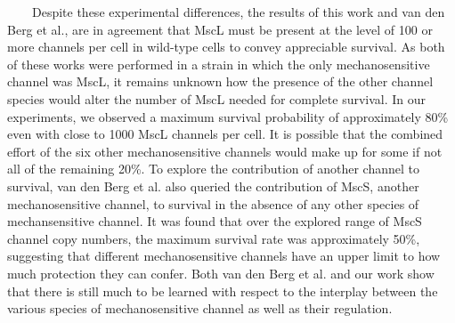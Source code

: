 ~~~~Despite
these
experimental
differences,
the
results
of
this
work
and
van
den
Berg
et
al.,
are in
agreement
that
MscL
must
be
present
at the
level
of 100
or
more
channels
per
cell
in
wild-type
cells
to
convey
appreciable
survival.
As
both
of
these
works
were
performed
in a
strain
in
which
the
only
mechanosensitive
channel
was
MscL,
it
remains
unknown
how
the
presence
of the
other
channel
species
would
alter
the
number
of
MscL
needed
for
complete
survival.
In our
experiments,
we
observed
a
maximum
survival
probability
of
approximately
80\%
even
with
close
to
1000
MscL
channels
per
cell.
It is
possible
that
the
combined
effort
of the
six
other
mechanosensitive
channels
would
make
up for
some
if not
all of
the
remaining
20\%.
To
explore
the
contribution
of
another
channel
to
survival,
van
den
Berg
et al.
also
queried
the
contribution
of
MscS,
another
mechanosensitive
channel,
to
survival
in the
absence
of any
other
species
of
mechansensitive
channel.
It was
found
that
over
the
explored
range
of
MscS
channel
copy
numbers,
the
maximum
survival
rate
was
approximately
50\%,
suggesting
that
different
mechanosensitive
channels
have
an
upper
limit
to how
much
protection
they
can
confer.
Both
van
den
Berg
et al.
and
our
work
show
that
there
is
still
much
to be
learned
with
respect
to the
interplay
between
the
various
species
of
mechanosensitive
channel
as
well
as
their
regulation.

